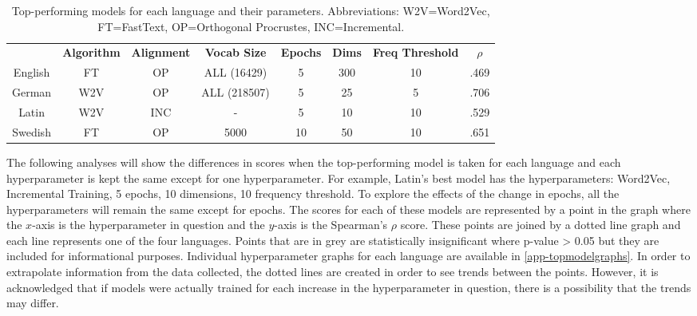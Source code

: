 \begin{table}[h]
\centering
\begin{tabular}{cccccccc} 
\toprule
\textbf{ } & \textbf{ Algorithm } & \textbf{ Alignment } & \textbf{ Vocab Size } & \textbf{ Epochs } & \textbf{ Dims } & \textbf{ Freq Threshold } & \textbf{ $\rho$ }  \\
English    & FT              & OP               & ALL (16429)      & 5                 & 300             & 10               & .469            \\
German     & W2V             & OP               & ALL (218507)     & 5                 & 25              & 5                & .706            \\
Latin      & W2V             & INC              & -                & 5                 & 10              & 10               & .529            \\
Swedish    & FT              & OP               & 5000             & 10                & 50              & 10               & .651            \\
\bottomrule
\end{tabular}
\caption{Top-performing models for each language and their parameters. Abbreviations: W2V=Word2Vec, FT=FastText, OP=Orthogonal Procrustes, INC=Incremental.}
\label{tab:top-models}
\end{table}

The following analyses will show the differences in scores when the top-performing model is taken for each language and each hyperparameter is kept the same except for one hyperparameter. For example, Latin’s best model has the hyperparameters: Word2Vec, Incremental Training, 5 epochs, 10 dimensions, 10 frequency threshold. To explore the effects of the change in epochs, all the hyperparameters will remain the same except for epochs. The scores for each of these models are represented by a point in the graph where the $x$-axis is the hyperparameter in question and the $y$-axis is the Spearman's $\rho$ score. These points are joined by a dotted line graph and each line represents one of the four languages. Points that are in grey are statistically insignificant where p-value > 0.05 but they are included for informational purposes. Individual hyperparameter graphs for each language are available in \autoref{app-topmodelgraphs}. In order to extrapolate information from the data collected, the dotted lines are created in order to see trends between the points. However, it is acknowledged that if models were actually trained for each increase in the hyperparameter in question, there is a possibility that the trends may differ. 

